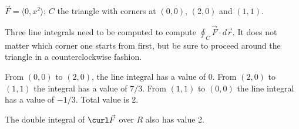 {$\vec F = \langle 0,x^2\rangle$; $C$ the triangle with corners at $(0,0)$, $(2,0)$ and $(1,1)$.
}
{Three line integrals need to be computed to compute $\oint_C \vec F\cdot d\vec r$. It does not matter which corner one starts from first, but be sure to proceed around the triangle in a counterclockwise fashion.

From $(0,0)$ to $(2,0)$, the line integral has a value of 0. From $(2,0)$ to $(1,1)$ the integral has a value of $7/3$. From $(1,1)$ to $(0,0)$ the line integral has a value of $-1/3$. Total value is 2.

The double integral of $\curl\vec F$ over $R$ also has value 2.
}
